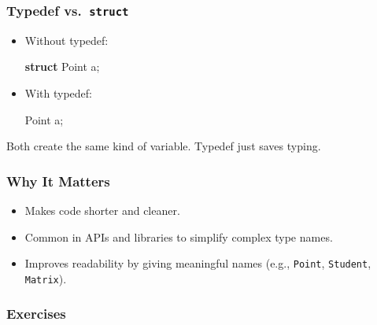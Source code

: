 \documentclass[
  letterpaper,
  DIV=11,
  numbers=noendperiod]{scrreprt}
\newenvironment{Shaded}{\begin{snugshade}}{\end{snugshade}}
\newcommand{\KeywordTok}[1]{\textcolor[rgb]{0.00,0.23,0.31}{\textbf{#1}}}
\newcommand{\NormalTok}[1]{\textcolor[rgb]{0.00,0.23,0.31}{#1}}
\newcommand{\OperatorTok}[1]{\textcolor[rgb]{0.37,0.37,0.37}{#1}}
\providecommand{\tightlist}{%
  \setlength{\itemsep}{0pt}\setlength{\parskip}{0pt}}
\begin{document}
\subsubsection{\texorpdfstring{Typedef
vs.~\texttt{struct}}{Typedef vs.~struct}}\label{typedef-vs.-struct}

\begin{itemize}
\item
  Without typedef:

\begin{Shaded}
\begin{Highlighting}[]
\KeywordTok{struct}\NormalTok{ Point a}\OperatorTok{;}
\end{Highlighting}
\end{Shaded}
\item
  With typedef:

\begin{Shaded}
\begin{Highlighting}[]
\NormalTok{Point a}\OperatorTok{;}
\end{Highlighting}
\end{Shaded}
\end{itemize}

Both create the same kind of variable. Typedef just saves typing.

\subsubsection{Why It Matters}\label{why-it-matters-35}

\begin{itemize}
\tightlist
\item
  Makes code shorter and cleaner.
\item
  Common in APIs and libraries to simplify complex type names.
\item
  Improves readability by giving meaningful names (e.g., \texttt{Point},
  \texttt{Student}, \texttt{Matrix}).
\end{itemize}

\subsubsection{Exercises}\label{exercises-36}
\end{document}
